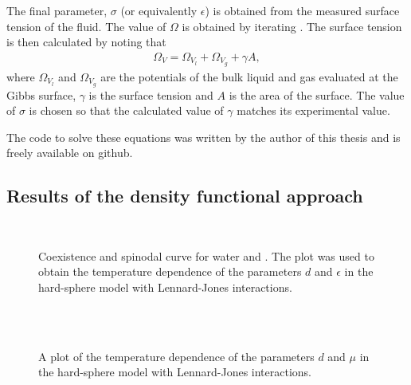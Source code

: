 The final parameter, $\sigma$ (or equivalently $\epsilon$) is obtained from the measured surface tension of the fluid.
The value of $\Omega$ is obtained by iterating .  
The surface tension is then calculated by noting that
\begin{align}
  \Omega_V = \Omega_{V_l} + \Omega_{V_g} + \gamma A,
\end{align}
where $\Omega_{V_l}$ and $\Omega_{V_g}$ are the potentials of the bulk liquid and gas evaluated at the Gibbs surface,
$\gamma$ is the surface tension and $A$ is the area of the surface.
The value of $\sigma$ is chosen so that the calculated value of $\gamma$ matches its experimental value.


The code to solve these equations was written by the author of this thesis and is freely available on github\cite{NucleationCode}.

\subsection{Results of the density functional approach}\label{sec:nuc:DFT:results}


\begin{figure}
  \hspace*{-8mm}
  \\
  \hspace*{-8mm}
  \caption{Coexistence and spinodal curve for water and \pfp.
    The plot was used to obtain the temperature dependence of the parameters $d$ and $\epsilon$ 
    in the hard-sphere model with Lennard-Jones interactions.
  }
 \label{fig:nuc:coex}
\end{figure}

\begin{figure}
  \hspace*{-22mm}
  \\
  \hspace*{-22mm}
  \\
  \caption{
    A plot of the  temperature dependence of the parameters $d$ and $\mu$ 
    in the hard-sphere model with Lennard-Jones interactions.
  }
 \label{fig:nuc:params}
\end{figure}

